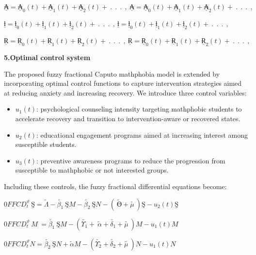 \(\underline{₳} = {\underline{₳}}_{0}(t) + {\underline{₳}}_{1}(t) + {\underline{₳}}_{2}(t) + \ .\ \ .\ \ .\ \ ,\ \underline{₳} = {\underline{₳}}_{0}(t) + {\underline{₳}}_{1}(t) + {\underline{₳}}_{2}(t) + \ .\ \ .\ \ .\ \ ,\)

\(\underline{ƚ} = {\underline{ƚ}}_{0}(t) + {\underline{ƚ}}_{1}(t) + {\underline{ƚ}}_{2}(t) + \ .\ \ .\ \ .\ \ ,\ \underline{ƚ} = {\underline{ƚ}}_{0}(t) + {\underline{ƚ}}_{1}(t) + {\underline{ƚ}}_{2}(t) + \ .\ \ .\ \ .\ \ ,\)

\(\underline{Ɍ} = {\underline{Ɍ}}_{0}(t) + {\underline{Ɍ}}_{1}(t) + {\underline{Ɍ}}_{2}(t) + \ .\ \ .\ \ .\ \ ,\ \underline{Ɍ} = {\underline{Ɍ}}_{0}(t) + {\underline{Ɍ}}_{1}(t) + {\underline{Ɍ}}_{2}(t) + \ .\ \ .\ \ .\ \ ,\)

\textbf{5.Optimal control system}

The proposed fuzzy fractional Caputo mathphobia model is extended by incorporating optimal control functions to capture intervention strategies aimed at reducing anxiety and increasing recovery. We introduce three control variables:

\begin{itemize}
\item
  \(u_{1}(t)\): psychological counseling intensity targeting mathphobic students to accelerate recovery and transition to intervention-aware or recovered states.
\item
  \(u_{2}(t)\): educational engagement programs aimed at increasing interest among susceptible students.
\item
  \(u_{3}(t)\): preventive awareness programs to reduce the progression from susceptible to mathphobic or not interested groups.
\end{itemize}

Including these controls, the fuzzy fractional differential equations become:

\(0FFCD_{t}^{\vartheta}\ Ş = \widetilde{\Lambda} - \widetilde{\beta_{1}}\ ŞM - \widetilde{\beta_{2}}\ ŞN - \left( \ \widetilde{Ө} + \widetilde{\mu\ } \right)Ş - u_{2}(t)Ş\)

\(0FFCD_{t}^{\vartheta}\ M\  = \widetilde{\beta_{1}}\ ŞM - \left( \widetilde{\Upsilon_{1}} + \ \widetilde{\alpha} + \widetilde{\delta_{1}} + \widetilde{\mu\ } \right)M - u_{1}(t)M\)

\(0FFCD_{t}^{\vartheta}N = \widetilde{\beta_{2}}\ ŞN + \widetilde{\alpha}M - \left( \widetilde{\Upsilon_{2}} + \widetilde{\delta_{2}} + \widetilde{\mu\ } \right)N - u_{1}(t)N\)

